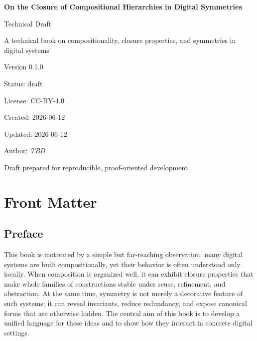\documentclass[11pt]{article}
\begin{document}
\begin{titlepage}
\centering
\vspace*{1.25in}

{\Huge\bfseries On the Closure of Compositional Hierarchies in Digital Symmetries\par}
\vspace{0.35in}
{\Large Technical Draft\par}
\vspace{0.8in}

{\large A technical book on compositionality, closure properties, and symmetries in digital systems\par}
\vspace{0.85in}

{\large Version 0.1.0\par}
\vspace{0.25in}
{\large Status: draft\par}
\vspace{0.25in}
{\large License: CC-BY-4.0\par}
\vspace{0.25in}
{\large Created: 2026-06-12\par}
\vspace{0.25in}
{\large Updated: 2026-06-12\par}
\vspace{0.25in}
{\large Author: \textit{TBD}\par}

\vfill

{\large Draft prepared for reproducible, proof-oriented development\par}
\end{titlepage}

\cleardoublepage


\section{Front Matter}

\subsection{Preface}

This book is motivated by a simple but far-reaching observation: many digital systems are built compositionally, yet their behavior is often understood only locally. When composition is organized well, it can exhibit closure properties that make whole families of constructions stable under reuse, refinement, and abstraction. At the same time, symmetry is not merely a decorative feature of such systems; it can reveal invariants, reduce redundancy, and expose canonical forms that are otherwise hidden. The central aim of this book is to develop a unified language for these ideas and to show how they interact in concrete digital settings.
\end{document}
